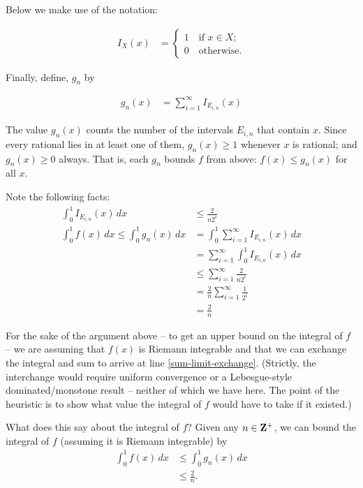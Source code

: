 \documentclass{article}
\begin{document}
Below we make use of the notation: 

\begin{align*}
I_X(x) &= \begin{cases} 1 \quad \text{if $x \in X$}; \\ 0 \quad \text{otherwise.} \end{cases}
\end{align*}

Finally, define, $g_n$ by

\begin{align*}
	g_{n}(x) &= \sum_{i=1}^\infty I_{E_{i,n}}(x)
\end{align*}

The value $g_n(x)$ counts the number of the intervals $E_{i,n}$ that contain
$x$. Since every rational lies in at least one of them, $g_n(x) \ge 1$
whenever $x$ is rational; and $g_n(x) \ge 0$ always. That is, each $g_n$
bounds $f$ from above: $f(x) \le g_n(x)$ for all $x$.

Note the following facts:
\begin{align}
	\int_{0}^1 I_{E_{i,n}}(x) \, dx &\le \frac{2}{n2^{i}} \nonumber \\
	\int_0^1 f(x) \, dx \le \int_0^1 g_n(x) \, dx &= \int_0^1 \sum_{i=1}^\infty  I_{E_{i,n}}(x)\, dx  \nonumber \\
												&=  \sum_{i=1}^\infty \int_0^1 I_{E_{i,n}}(x)\, dx  \label{sum-limit-exchange} \\
												&\le  \sum_{i=1}^\infty \frac{2}{n2^{i}} \nonumber \\
												&=  \frac{2}{n} \sum_{i=1}^\infty \frac{1}{2^{i}} \nonumber \\
												&=  \frac{2}{n} \nonumber
 \end{align}

For the sake of the argument above -- to get an upper bound on the integral of $f$ -- we are assuming that
$f(x)$ is Riemann integrable and that we
can exchange the integral and sum to arrive at line \eqref{sum-limit-exchange}.
(Strictly, the interchange would require uniform convergence or a Lebesgue-style
dominated/monotone result -- neither of which we have here. The point of the
heuristic is to show what value the integral of $f$ would have to take if it
existed.)

What does this say about the integral of $f$? 
Given any $n \in {\bf Z}^+$, we can bound the integral of $f$
(assuming it is Riemann integrable) by
\begin{align*}
	\int_0^1 f(x) \, dx &\le \int_0^1 g_{n}(x) \, dx \\
						&\le  \frac{2}{n}.
\end{align*}
\end{document}
